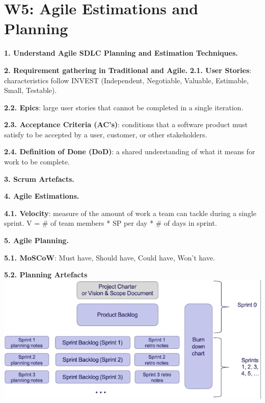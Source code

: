 \section{W5: Agile Estimations and Planning}

\textbf{1. Understand Agile SDLC Planning and Estimation Techniques.}

\textbf{2. Requirement gathering in Traditional and Agile.}
    \textbf{2.1. User Stories}: characteristics follow INVEST (Independent, Negotiable, Valuable, Estimable, Small, Testable).

    \textbf{2.2. Epics}: large user stories that cannot be completed in a single iteration.

    \textbf{2.3. Acceptance Criteria (AC's)}: conditions that a software product must satisfy to be accepted by a user, customer, or other stakeholders.

    \textbf{2.4. Definition of Done (DoD)}: a shared understanding of what it means for work to be complete.



\textbf{3. Scrum Artefacts.}

\textbf{4. Agile Estimations.}

    \textbf{4.1. Velocity}: measure of the amount of work a team can tackle during a single sprint. V = \# of team members * SP per day * \# of days in sprint.

\textbf{5. Agile Planning.}

    \textbf{5.1. MoSCoW}: Must have, Should have, Could have, Won't have.

    \textbf{5.2. Planning Artefacts}
    \includegraphics[width=\linewidth]{figs/SCR-20240606-lcfi.png}
